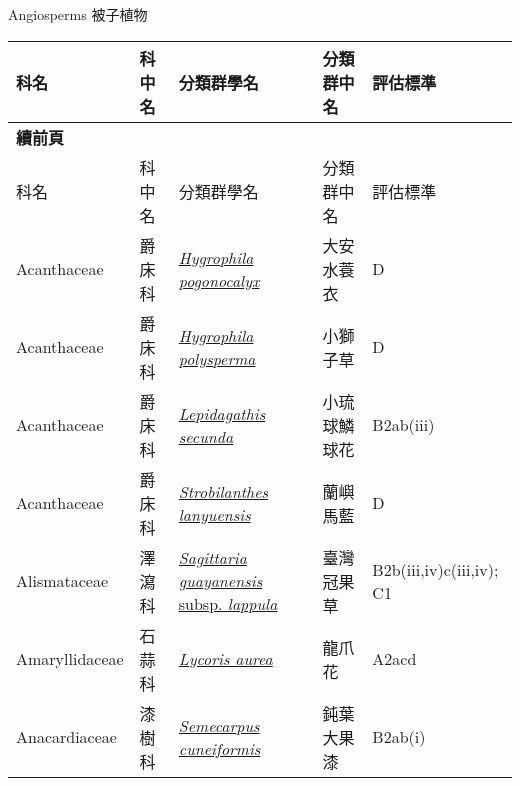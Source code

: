 \noindent\normalfont\selectfont Angiosperms 被子植物
\footnotesize\selectfont
        {\def\arraystretch{1.5}\tabcolsep=2pt
        \begin{longtable}{p{2.5cm}p{2.5cm}p{4.5cm}p{2.5cm}p{3cm}}
        \toprule
          科名 & 科中名 & 分類群學名 & 分類群中名 & 評估標準 \\
        \midrule 
        \endfirsthead

        {{\bfseries 續前頁 }} \\
        科名 & 科中名 & 分類群學名 & 分類群中名 & 評估標準 \\
        \midrule
        \endhead
                Acanthaceae & 爵床科 & \href{http://www.theplantlist.org/tpl1.1/search?q=Hygrophila+pogonocalyx}{\textit{Hygrophila pogonocalyx} } & 大安水蓑衣 & D \index{Hygrophila@\textit{Hygrophila}!pogonocalyx@\textit{pogonocalyx}}  \index{大安水蓑衣} \\
    Acanthaceae & 爵床科 & \href{http://www.theplantlist.org/tpl1.1/search?q=Hygrophila+polysperma}{\textit{Hygrophila polysperma} } & 小獅子草 & D \index{Hygrophila@\textit{Hygrophila}!polysperma@\textit{polysperma}}  \index{小獅子草} \\
    Acanthaceae & 爵床科 & \href{http://www.theplantlist.org/tpl1.1/search?q=Lepidagathis+secunda}{\textit{Lepidagathis secunda} } & 小琉球鱗球花 & B2ab(iii) \index{Lepidagathis@\textit{Lepidagathis}!secunda@\textit{secunda}}  \index{小琉球鱗球花} \\
    Acanthaceae & 爵床科 & \href{http://www.theplantlist.org/tpl1.1/search?q=Strobilanthes+lanyuensis}{\textit{Strobilanthes lanyuensis} } & 蘭嶼馬藍 & D \index{Strobilanthes@\textit{Strobilanthes}!lanyuensis@\textit{lanyuensis}}  \index{蘭嶼馬藍} \\
    Alismataceae & 澤瀉科 & \href{http://www.theplantlist.org/tpl1.1/search?q=Sagittaria+guayanensis+subsp.+lappula}{\textit{Sagittaria guayanensis} subsp. \textit{lappula} } & 臺灣冠果草 & B2b(iii,iv)c(iii,iv); C1 \index{Sagittaria@\textit{Sagittaria}!guayanensis@\textit{guayanensis}!subsp. lappula@subsp. \textit{lappula}}  \index{臺灣冠果草} \\
    Amaryllidaceae & 石蒜科 & \href{http://www.theplantlist.org/tpl1.1/search?q=Lycoris+aurea}{\textit{Lycoris aurea} } & 龍爪花 & A2acd \index{Lycoris@\textit{Lycoris}!aurea@\textit{aurea}}  \index{龍爪花} \\
    Anacardiaceae & 漆樹科 & \href{http://www.theplantlist.org/tpl1.1/search?q=Semecarpus+cuneiformis}{\textit{Semecarpus cuneiformis} } & 鈍葉大果漆 & B2ab(i) \index{Semecarpus@\textit{Semecarpus}!cuneiformis@\textit{cuneiformis}}  \index{鈍葉大果漆} \\

\end{longtable}}
